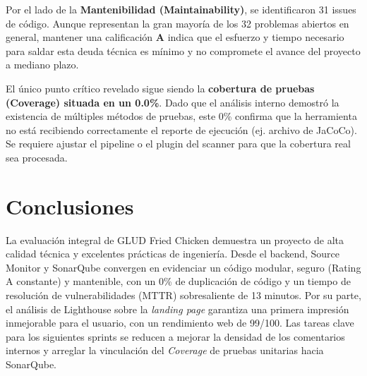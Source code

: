\documentclass[12pt, a4paper]{article}
\begin{document}
Por el lado de la \textbf{Mantenibilidad (Maintainability)}, se identificaron 31 issues de código. Aunque representan la gran mayoría de los 32 problemas abiertos en general, mantener una calificación \textbf{A} indica que el esfuerzo y tiempo necesario para saldar esta deuda técnica es mínimo y no compromete el avance del proyecto a mediano plazo.

El único punto crítico revelado sigue siendo la \textbf{cobertura de pruebas (Coverage) situada en un 0.0\%}. Dado que el análisis interno demostró la existencia de múltiples métodos de pruebas, este 0\% confirma que la herramienta no está recibiendo correctamente el reporte de ejecución (ej. archivo de JaCoCo). Se requiere ajustar el pipeline o el plugin del scanner para que la cobertura real sea procesada.

\section{Conclusiones}
La evaluación integral de GLUD Fried Chicken demuestra un proyecto de alta calidad técnica y excelentes prácticas de ingeniería. Desde el backend, Source Monitor y SonarQube convergen en evidenciar un código modular, seguro (Rating A constante) y mantenible, con un 0\% de duplicación de código y un tiempo de resolución de vulnerabilidades (MTTR) sobresaliente de 13 minutos. Por su parte, el análisis de Lighthouse sobre la \textit{landing page} garantiza una primera impresión inmejorable para el usuario, con un rendimiento web de 99/100. Las tareas clave para los siguientes sprints se reducen a mejorar la densidad de los comentarios internos y arreglar la vinculación del \textit{Coverage} de pruebas unitarias hacia SonarQube.
\end{document}

